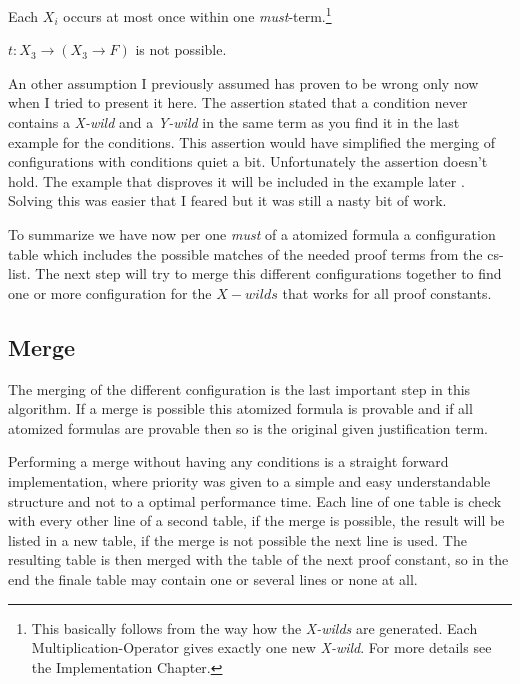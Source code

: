 \begin{assertion}
Each $X_i$ occurs at most once within one \emph{must}-term.\footnote{This basically follows from the way how the \emph{X-wilds} are generated. Each Multiplication-Operator gives exactly one new \emph{X-wild}. For more details see the Implementation Chapter.}
\end{assertion}


\begin{example}
$t:X_3 \rightarrow (X_3 \rightarrow F)$ is not possible.
\end{example}

An other assumption I previously assumed has proven to be wrong only now when I tried to present it here. The assertion stated that a condition never contains a \emph{X-wild} and a \emph{Y-wild} in the same term as you find it in the last example for the conditions. This assertion would have simplified the merging of configurations with conditions quiet a bit. Unfortunately the assertion doesn't hold. The example that disproves it will be included in the example later . Solving this was easier that I feared but it was still a nasty bit of work.

\par
To summarize we have now per one \emph{must} of a atomized formula a configuration table which includes the possible matches of the needed proof terms from the cs-list. The next step will try to merge this different configurations together to find one or more configuration for the $X-wilds$ that works for all proof constants.

\subsection{Merge}
The merging of the different configuration is the last important step in this algorithm. If a merge is possible this atomized formula is provable and if all atomized formulas are provable then so is the original given justification term.

Performing a merge without having any conditions is a straight forward implementation, where priority was given to a simple and easy understandable structure and not to a optimal performance time. Each line of one table is check with every other line of a second table, if the merge is possible, the result will be listed in a new table, if the merge is not possible the next line is used. The resulting table is then merged with the table of the next proof constant, so in the end the finale table may contain one or several lines or none at all. 

